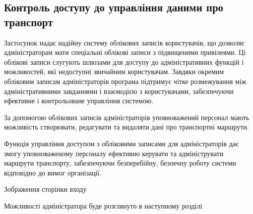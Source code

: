 \subsection{Контроль доступу до управління даними про транспорт}
\label{subsec:route-search-subsection}

Застосунок надає надійну систему облікових записів користувачів, що дозволяє адміністраторам мати спеціальні облікові записи з підвищеними привілеями. Ці облікові записи слугують шлюзами для доступу до адміністративних функцій і можливостей, які недоступні звичайним користувачам. Завдяки окремим обліковим записам адміністраторів програма підтримує чітке розмежування між адміністративними завданнями і взаємодією з користувачами, забезпечуючи ефективне і контрольоване управління системою.

За допомогою облікових записів адміністраторів уповноважений персонал мають можливість створювати, редагувати та видаляти дані про транспортні маршрути.

Функція управління доступом з обліковими записами для адміністраторів дає змогу уповноваженому персоналу ефективно керувати та адмініструвати маршрути транспорту, забезпечуючи безперебійну, безпечну роботу системи відповідно до вимог організації.

Зображення сторінки входу

Можливості адміністратора буде розглянуто в наступному розділі